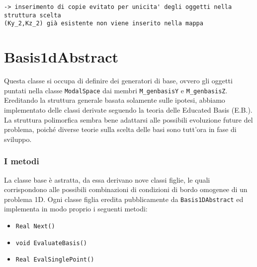 \begin{lstlisting}[style = general,frame=top]
-> inserimento di copie evitato per unicita' degli oggetti nella struttura scelta
(Ky_2,Kz_2) già esistente non viene inserito nella mappa
\end{lstlisting}



 \section{Basis1dAbstract}

Questa classe si occupa di definire dei generatori di base, ovvero gli oggetti puntati nella classe \texttt{ModalSpace} dai membri \texttt{M\_genbasisY} e \texttt{M\_genbasisZ}. Ereditando la struttura generale basata solamente sulle ipotesi, abbiamo implementato delle classi derivate seguendo la teoria delle Educated Basis (E.B.). La struttura polimorfica sembra bene adattarsi alle possibili evoluzione future del problema, poich\'e diverse teorie sulla scelta delle basi sono tutt'ora in fase di sviluppo.
 
\subsubsection{I metodi}

La classe base \`e astratta, da essa derivano nove classi figlie, le quali corrispondono alle possibili combinazioni di condizioni di bordo omogenee di un problema 1D. Ogni classe figlia eredita pubblicamente da \texttt{Basis1DAbstract} ed implementa in modo proprio i seguenti metodi:

\begin{itemize}
\item \texttt{Real Next()} 
\item \texttt{void EvaluateBasis()}
\item \texttt{Real EvalSinglePoint()}
\end{itemize}

